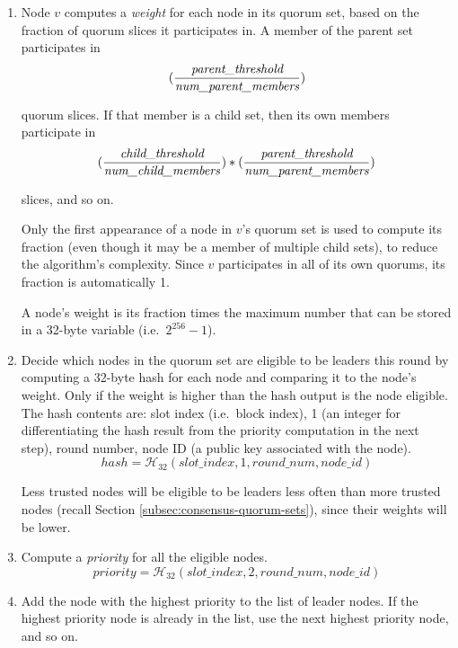 \begin{enumerate}
    \item Node $v$ computes a {\em weight} for each node in its quorum set, based on the fraction of quorum slices it participates in. A member of the parent set participates in\vspace{.115cm}
    \[(\frac{\textrm{\em parent\_threshold}}{\textrm{\em num\_parent\_members}})\]
    
    quorum slices. If that member is a child set, then its own members participate in\vspace{.115cm}
    \[(\frac{\textrm{\em child\_threshold}}{\textrm{\em num\_child\_members}})*(\frac{\textrm{\em parent\_threshold}}{\textrm{\em num\_parent\_members}})\]
    
    slices, and so on.

    Only the first appearance of a node in $v$'s quorum set is used to compute its fraction (even though it may be a member of multiple child sets), to reduce the algorithm's complexity. Since $v$ participates in all of its own quorums, its fraction is automatically 1.

    A node's weight is its fraction times the maximum number that can be stored in a 32-byte variable (i.e.\ $2^{256} - 1$).
    
    \item Decide which nodes in the quorum set are eligible to be leaders this round by computing a 32-byte hash for each node and comparing it to the node's weight. Only if the weight is higher than the hash output is the node eligible. The hash contents are: slot index (i.e.\ block index), 1 (an integer for differentiating the hash result from the priority computation in the next step), round number, node ID (a public key associated with the node).\vspace{.155cm}
    \[hash  = \mathcal{H}_{32}(slot\_index, 1, round\_num, node\_id)\]
    
    Less trusted nodes will be eligible to be leaders less often than more trusted nodes (recall Section \ref{subsec:consensus-quorum-sets}), since their weights will be lower.

    \item Compute a {\em priority} for all the eligible nodes.\vspace{.155cm}
    \[priority  = \mathcal{H}_{32}(slot\_index, 2, round\_num, node\_id)\]

    \item Add the node with the highest priority to the list of leader nodes. If the highest priority node is already in the list, use the next highest priority node, and so on.
\end{enumerate}

